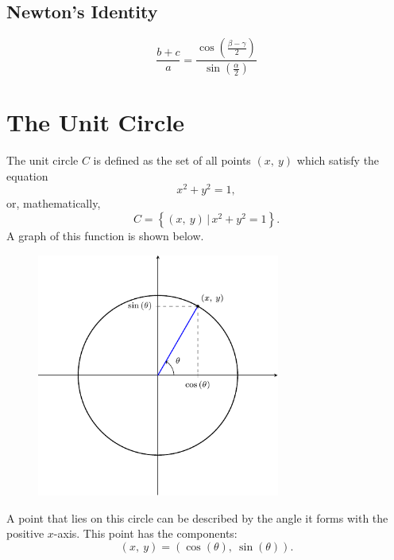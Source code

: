 \documentclass{article}
\begin{document}
\subsection{Newton's Identity}
\begin{equation*}
    \frac{b+c}{a}=\frac{\cos{\left( \frac{\beta-\gamma}{2} \right)}}{\sin{\left( \frac{\alpha}{2} \right)}}
\end{equation*}
\section{The Unit Circle}
The unit circle \(C\) is defined as the set of all points \(\left( x,\:
y \right)\) which satisfy the equation
\begin{equation*}
    x^2 + y^2 = 1,
\end{equation*}
or, mathematically,
\begin{equation*}
    C = \left\{ \left( x,\: y \right) \,\vert\, x^2 + y^2 = 1 \right\}.
\end{equation*}
A graph of this function is shown below.
\begin{figure}[H]
    \centering
    \includegraphics[width=8cm]{figures/unit-circle.pdf}
\end{figure}
A point that lies on this circle can be described by the angle it forms
with the positive \(x\)-axis. This point has the components:
\begin{equation*}
    \left( x,\: y \right) = \left( \cos{\left( \theta \right)},\: \sin{\left( \theta \right)} \right).
\end{equation*}
\end{document}
